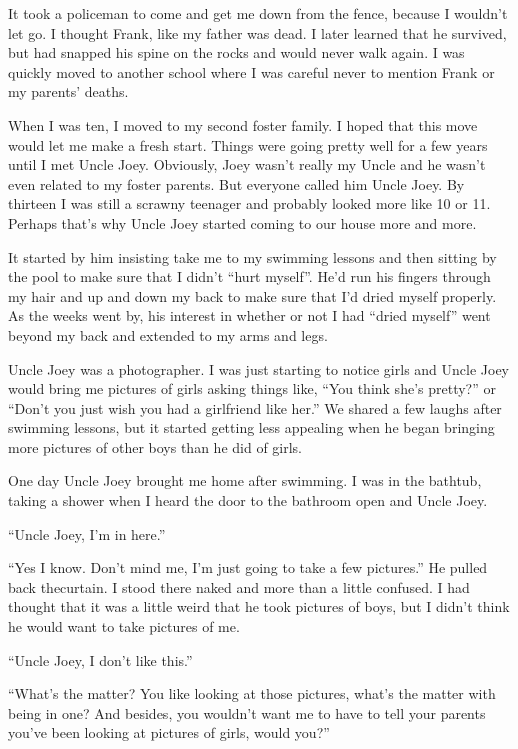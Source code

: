 \documentclass[11pt,letterpaper]{article}
\begin{document}
It took a policeman to come and get me down from the fence, because I wouldn't let go. I thought Frank, like my father was dead. I later learned that he survived, but had snapped his spine on the rocks and would never walk again. I was quickly moved to another school where I was careful never to mention Frank or my parents' deaths.


When I was ten, I moved to my second foster family. I hoped that this move would let me make a fresh start. Things were going pretty well for a few years until I met Uncle Joey. Obviously, Joey wasn't really my Uncle and he wasn't even related to my foster parents. But everyone called him Uncle Joey. By thirteen I was still a scrawny teenager and probably looked more like 10 or 11. Perhaps that's why Uncle Joey started coming to our house more and more.

It started by him insisting take me to my swimming lessons and then sitting by the pool to make sure that I didn't ``hurt myself''. He'd run his fingers through my hair and up and down my back to make sure that I'd dried myself properly. As the weeks went by, his interest in whether or not I had ``dried myself'' went beyond my back and extended to my arms and legs.

Uncle Joey was a photographer. I was just starting to notice girls and Uncle Joey would bring me pictures of girls asking things like, ``You think she's pretty?'' or ``Don't you just wish you had a girlfriend like her.'' We shared a few laughs after swimming lessons, but it started getting less appealing when he began bringing more pictures of other boys than he did of girls.

One day Uncle Joey brought me home after swimming. I was in the bathtub, taking a shower when I heard the door to the bathroom open and Uncle Joey.

``Uncle Joey, I'm in here.''

``Yes I know. Don't mind me, I'm just going to take a few pictures.'' He pulled back thecurtain. I stood there naked and more than a little confused. I had thought that it was a little weird that he took pictures of boys, but I didn't think he would want to take pictures of me.

``Uncle Joey, I don't like this.''

``What's the matter? You like looking at those pictures, what's the matter with being in one? And besides, you wouldn't want me to have to tell your parents you've been looking at pictures of girls, would  you?''
\end{document}
